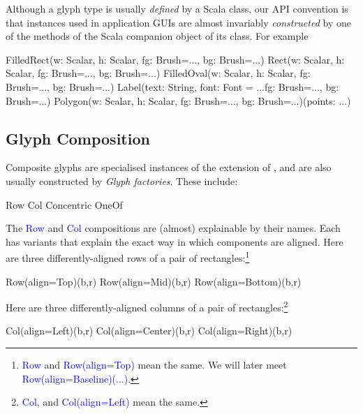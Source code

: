\documentclass[12pt,a4paper]{article}
\def\Scala#1{\textcolor{blue}{\textsf{#1}}}
\def\SS#1{\subsection{#1}}
\begin{document}
Although a glyph type is usually \textit{defined} by a Scala class,
our API convention is that instances used in application GUIs are
almost invariably \textit{constructed} by one of the methods of the
Scala companion object of its class. For example

\begin{scala}
 FilledRect(w: Scalar, h: Scalar,    fg: Brush=..., bg: Brush=...)
 Rect(w: Scalar, h: Scalar,          fg: Brush=..., bg: Brush=...)
 FilledOval(w: Scalar, h: Scalar,    fg: Brush=..., bg: Brush=...)
 Label(text: String, font: Font = ...fg: Brush=..., bg: Brush=...)
 Polygon(w: Scalar, h: Scalar,
         fg: Brush=..., bg: Brush=...)(points: ...)
\end{scala}




\clearpage



\SS{Glyph Composition}

Composite glyphs are specialised instances of the 
extension of , and are also usually constructed by
\textit{Glyph factories}. These include:

\begin{scala}

        Row             Col
        Concentric      OneOf
\end{scala}

The \Scala{Row} and \Scala{Col} compositions are (almost)
explainable by their names. Each has variants that
explain the exact way in which components are aligned. Here
are three differently-aligned rows of a pair of rectangles:\footnote{
\Scala{Row} and \Scala{Row(align=Top)}
mean the same. We will later meet \Scala{Row(align=Baseline)(...)}.}
\begin{center}
\quad\quad
{}
\quad\quad
{}
\end{center}
\begin{scala}
   Row(align=Top)(b,r) Row(align=Mid)(b,r) Row(align=Bottom)(b,r)
\end{scala}






Here are three differently-aligned columns of a pair of rectangles:\footnote{
\Scala{Col}, and \Scala{Col(align=Left)} mean the same.}

\begin{center}
\quad\quad
{}
\quad\quad
{}
\end{center}
\begin{scala}
   Col(align=Left)(b,r) Col(align=Center)(b,r) Col(align=Right)(b,r)
\end{scala}
\end{document}

